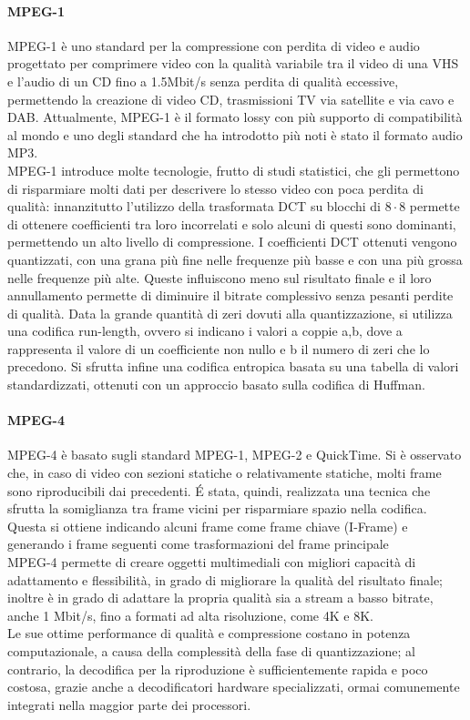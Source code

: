             \paragraph{MPEG-1}
            MPEG-1 è uno standard per la compressione con perdita di video e audio progettato per comprimere video con la qualità variabile tra il video di una \gls{VHS} e l'audio di un CD fino a 1.5Mbit/s senza perdita di qualità eccessive, permettendo la creazione di video CD, trasmissioni TV via satellite e via cavo e \gls{DAB}. Attualmente, MPEG-1 è il formato lossy con più supporto di compatibilità al mondo e uno degli standard che ha introdotto più noti è stato il formato audio MP3.
            \\
            MPEG-1 introduce molte tecnologie, frutto di studi statistici, che gli permettono di risparmiare molti dati per descrivere lo stesso video con poca perdita di qualità: innanzitutto l'utilizzo della trasformata DCT su blocchi di \(8\cdot8\) permette di ottenere coefficienti tra loro incorrelati e solo alcuni di questi sono dominanti, permettendo un alto livello di compressione. I coefficienti DCT ottenuti vengono quantizzati, con una grana più fine nelle frequenze più basse e con una più grossa nelle frequenze più alte. Queste influiscono meno sul risultato finale e il loro annullamento permette di diminuire il bitrate complessivo senza pesanti perdite di qualità.
            Data la grande quantità di zeri dovuti alla quantizzazione, si utilizza una codifica run-length, ovvero si indicano i valori a coppie a,b, dove a rappresenta il valore di un coefficiente non nullo e b il numero di zeri che lo precedono. Si sfrutta infine una codifica entropica basata su una tabella di valori standardizzati, ottenuti con un approccio basato sulla codifica di Huffman.

            \paragraph{MPEG-4}
            MPEG-4 è basato sugli standard MPEG-1, MPEG-2 e QuickTime. Si è osservato che, in caso di video con sezioni statiche o relativamente statiche, molti frame sono riproducibili dai precedenti. É stata, quindi, realizzata una tecnica che sfrutta la somiglianza tra frame vicini per risparmiare spazio nella codifica. Questa si ottiene indicando alcuni frame come frame chiave (I-Frame) e generando i frame seguenti come trasformazioni del frame principale
            \\
            MPEG-4 permette di creare oggetti multimediali con migliori capacità di adattamento e flessibilità, in grado di migliorare la qualità del risultato finale; inoltre è in grado di adattare la propria qualità sia a stream a basso bitrate, anche 1 Mbit/s, fino a formati ad alta risoluzione, come 4K e 8K.
            \\
            Le sue ottime performance di qualità e compressione costano in potenza computazionale, a causa della complessità della fase di quantizzazione; al contrario, la decodifica per la riproduzione è sufficientemente rapida e poco costosa, grazie anche a decodificatori hardware specializzati, ormai comunemente integrati nella maggior parte dei processori.

